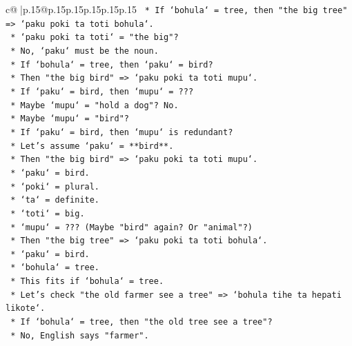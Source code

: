 \documentclass{article}
\begin{document}
{\begin{supertabular}{c@{$\;$}|p{.15\linewidth}@{}p{.15\linewidth}p{.15\linewidth}p{.15\linewidth}p{.15\linewidth}p{.15\linewidth}}
{{{\texttt{                    *   If `bohula` = tree, then "the big tree" => `paku poki ta toti bohula`.} \\
\texttt{                        *   `paku poki ta toti` = "the big"?} \\
\texttt{                        *   No, `paku` must be the noun.} \\
\texttt{                        *   If `bohula` = tree, then `paku` = bird?} \\
\texttt{                        *   Then "the big bird" => `paku poki ta toti mupu`.} \\
\texttt{                        *   If `paku` = bird, then `mupu` = ???} \\
\texttt{                        *   Maybe `mupu` = "hold a dog"? No.} \\
\texttt{                        *   Maybe `mupu` = "bird"?} \\
\texttt{                        *   If `paku` = bird, then `mupu` is redundant?} \\
\texttt{                        *   Let's assume `paku` = **bird**.} \\
\texttt{                        *   Then "the big bird" => `paku poki ta toti mupu`.} \\
\texttt{                            *   `paku` = bird.} \\
\texttt{                            *   `poki` = plural.} \\
\texttt{                            *   `ta` = definite.} \\
\texttt{                            *   `toti` = big.} \\
\texttt{                            *   `mupu` = ??? (Maybe "bird" again? Or "animal"?)} \\
\texttt{                        *   Then "the big tree" => `paku poki ta toti bohula`.} \\
\texttt{                            *   `paku` = bird.} \\
\texttt{                            *   `bohula` = tree.} \\
\texttt{                        *   This fits if `bohula` = tree.} \\
\texttt{                        *   Let's check "the old farmer see a tree" => `bohula tihe ta hepati likote`.} \\
\texttt{                            *   If `bohula` = tree, then "the old tree see a tree"?} \\
\texttt{                            *   No, English says "farmer".} \\
}}}
\end{supertabular}}
\end{document}
